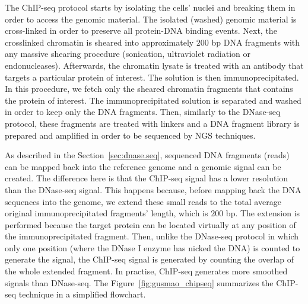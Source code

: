 The ChIP-seq protocol starts by isolating the cells' nuclei and breaking them in order to access the genomic material. The isolated (washed) genomic material is cross-linked in order to preserve all protein-DNA binding events. Next, the crosslinked chromatin is sheared into approximately $200$ bp DNA fragments with any massive shearing procedure (sonication, ultraviolet radiation or endonucleases). Afterwards, the chromatin lysate is treated with an antibody that targets a particular protein of interest. The solution is then immunoprecipitated. In this procedure, we fetch only the sheared chromatin fragments that contains the protein of interest. The immunoprecipitated solution is separated and washed in order to keep only the DNA fragments. Then, similarly to the DNase-seq protocol, these fragments are treated with linkers and a DNA fragment library is prepared and amplified in order to be sequenced by NGS techniques.

As described in the Section~\ref{sec:dnase.seq}, sequenced DNA fragments (reads) can be mapped back into the reference genome and a genomic signal can be created. The difference here is that the ChIP-seq signal has a lower resolution than the DNase-seq signal. This happens because, before mapping back the DNA sequences into the genome, we extend these small reads to the total average original immunoprecipitated fragments' length, which is \approxy$200$ bp. The extension is performed because the target protein can be located virtually at any position of the immunoprecipitated fragment. Then, unlike the DNase-seq protocol in which only one position (where the DNase I enzyme has nicked the DNA) is counted to generate the signal, the ChIP-seq signal is generated by counting the overlap of the whole extended fragment. In practise, ChIP-seq generates more smoothed signals than DNase-seq. The Figure~\ref{fig:gusmao_chipseq} summarizes the ChIP-seq technique in a simplified flowchart.

